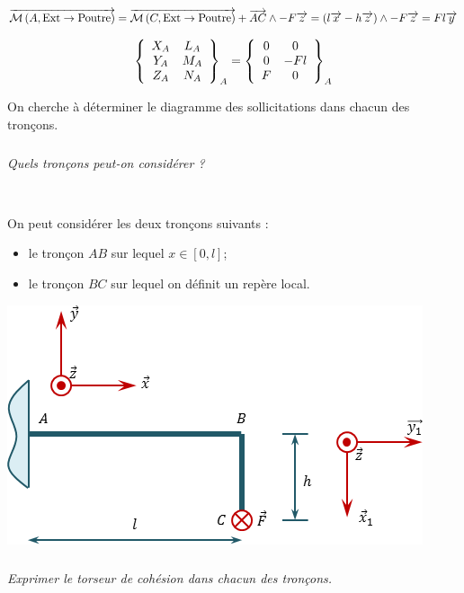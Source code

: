 \documentclass[10pt,fleqn]{article} %
\begin{document}
\begin{multicols}{2}
\begin{corrige}
$\vectm{A}{\text{Ext}}{\text{Poutre}}
=\vectm{C}{\text{Ext}}{\text{Poutre}} + \vect{AC}\wedge -F \vect{z}  
= \left(l\vect{x} - h\vect{z} \right) \wedge -F \vect{z}  
= Fl\vect{y}$

$$
\torseurcol{X_A}{Y_A}{Z_A}{L_A}{M_A}{N_A}{A}
= \torseurcol{0}{0}{F}{0}{-Fl}{0}{A}
$$

\end{corrige}
\else 
\fi


On cherche à déterminer le diagramme des sollicitations dans chacun des tronçons.

\subparagraph{}
\textit{Quels tronçons peut-on considérer ?}
\ifprof
\begin{corrige}~\\
\begin{minipage}[c]{.45\linewidth}
On peut considérer les deux tronçons suivants :
\begin{itemize}[label=,font=\color{ocre}] 
\item le tronçon $AB$ sur lequel $x\in[0,l]$;
\item le tronçon $BC$ sur lequel on définit un repère local.
\end{itemize}
\end{minipage} \hfill
\begin{minipage}[c]{.45\linewidth}
\begin{center}
\includegraphics[width=\linewidth]{images/exo_02_corr_01}
\end{center}
\end{minipage}
\end{corrige}
\else 
\fi

\subparagraph{}
\textit{Exprimer le torseur de cohésion dans chacun des tronçons.}

\ifprof
~\\
\begin{corrige} ~\\


\end{corrige}
\end{multicols}
\end{document}

